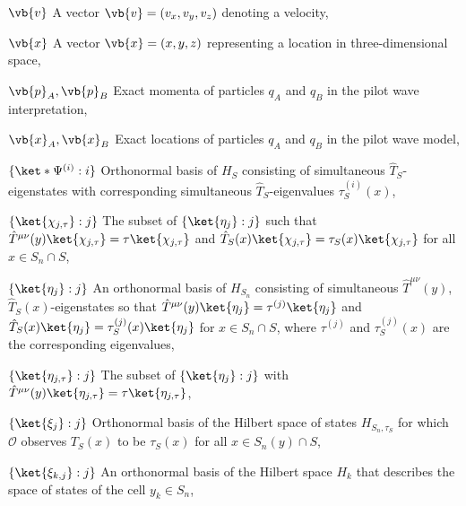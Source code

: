 \begin{thenomenclature}
      \item [{$\vb {v}$}]\begingroup A vector $\vb {v}= (v_x, v_y, v_z)$ denoting a velocity, \nomrefpage {}
      \item [{$\vb {x}$}]\begingroup A vector $\vb {x}= (x, y, z)$ representing a location in three-dimensional space, \nomrefpage {}
      \item [{$\vb{p}_A, \vb{p}_B$}]\begingroup Exact momenta of particles $q_A$ and $q_B$ in the pilot wave interpretation, \nomrefpage{}
      \item [{$\vb{x}_A, \vb{x}_B$}]\begingroup Exact locations of particles $q_A$ and $q_B$ in the pilot wave model, \nomrefpage{}
      \item [{$\{\ket*{\Psi^{(i)}}:i\}$}]\begingroup Orthonormal basis of $H_S$ consisting of simultaneous $\hat{T}_S$-eigenstates with corresponding simultaneous $\hat{T}_S$-eigenvalues $\tau^{(i)}_S(x)$, \nomrefpage{}
      \item [{$\{\ket{\chi_{j,\tau}}:j\}$}]\begingroup The subset of $\{\ket{\eta_j}:j\}$ such that $\hat{T}^{\mu\nu}(y)\ket{\chi_{j,\tau}}=\tau\ket{\chi_{j,\tau}}$ and $\hat{T}_S(x)\ket{\chi_{j,\tau}}=\tau_S(x)\ket{\chi_{j,\tau}}$ for all $x\in S_n\cap S$, \nomrefpage{}
      \item [{$\{\ket{\eta_j}:j\}$}]\begingroup An orthonormal basis of $H_{S_n}$ consisting of simultaneous $\hat{T}^{\mu\nu}(y)$, $\hat{T}_S(x)$-eigenstates so that $\hat{T}^{\mu\nu}(y)\ket{\eta_j}=\tau^{(j)}\ket{\eta_j}$ and $\hat{T}_{S}(x)\ket{\eta_j}=\tau_S^{(j)}(x)\ket{\eta_j}$ for $x\in S_n\cap S$, where $\tau^{(j)}$ and $\tau_S^{(j)}(x)$ are the corresponding eigenvalues, \nomrefpage{}
      \item [{$\{\ket{\eta_{j,\tau}}:j\}$}]\begingroup The subset of  $\{\ket{\eta_j}:j\}$ with $\hat{T}^{\mu\nu}(y)\ket{\eta_{j,\tau}}=\tau\ket{\eta_{j,\tau}}$, \nomrefpage{}
      \item [{$\{\ket{\xi_j}:j\}$}]\begingroup Orthonormal basis of the Hilbert space of states $H_{S_n,\tau_S}$ for which $\mathcal{O}$ observes $T_S(x)$ to be $\tau_S(x)$ for all $x\in S_n(y)\cap S$, \nomrefpage{}
      \item [{$\{\ket{\xi_{k,j}}:j\}$}]\begingroup An orthonormal basis of the Hilbert space $H_k$ that describes the space of states of the cell $y_k\in S_n$, \nomrefpage{}

\end{thenomenclature}
